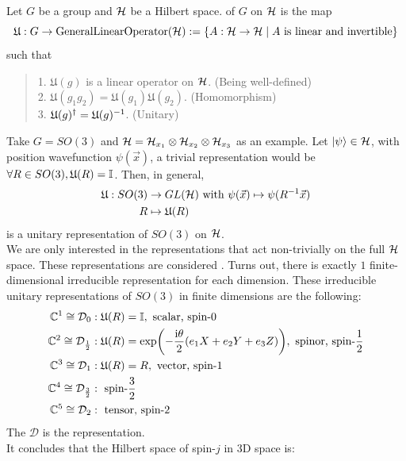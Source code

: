 \begin{definition}
    Let $G$ be a group and $\mathcal{H}$ be a Hilbert space.  of $G$ on $\mathcal{H}$ is the map
    $$\mathfrak{U}: G \to \text{GeneralLinearOperator}(\mathcal{H}) := \{A:\mathcal{H} \to \mathcal{H} \mid A \text{ is linear and invertible}\}$$
    such that
    \begin{quote}
        1. $\mathfrak{U}(g)$ is a linear operator on $\mathcal{H}$. (Being well-defined) \\
        2. $\mathfrak{U}(g_1g_2) = \mathfrak{U}(g_1)\mathfrak{U}(g_2)$. (Homomorphism) \\
        3. $\mathfrak{U}(g)^{\dagger} = \mathfrak{U}(g)^{-1}$. (Unitary)
    \end{quote}
\end{definition}
Take $G = SO(3)$ and $\mathcal{H} = \mathcal{H}_{x_1} \otimes \mathcal{H}_{x_2} \otimes \mathcal{H}_{x_3}$ as an example. Let $\ket{\psi} \in \mathcal{H}$, with position wavefunction $\psi(\vec{x})$, a trivial representation would be $\forall R \in SO(3), \mathfrak{U}(R) = \mathbb{I}$. Then, in general,
\begin{align*}
    \mathfrak{U}: SO(3) &\to GL(\mathcal{H}) \text{ with } \psi(\vec{x}) \mapsto \psi(R^{-1}\vec{x}) \\
    R &\mapsto \mathfrak{U}(R)
\end{align*}
is a unitary representation of $SO(3)$ on $\mathcal{H}$. \\
We are only interested in the representations that act non-trivially on the full $\mathcal{H}$ space. These representations are considered . Turns out, there is exactly $1$ finite-dimensional irreducible representation for each dimension. These irreducible unitary representations of $SO(3)$ in finite dimensions are the following:
\begin{align*}
    \mathbb{C}^1 \cong \mathcal{D}_0 &: \mathfrak{U}(R) = \mathbb{I}, \text{ scalar, spin-}0 \\
    \mathbb{C}^2 \cong \mathcal{D}_\frac{1}{2} &: \mathfrak{U}(R) = \exp(-\frac{\mathrm{i} \theta}{2}(e_1X + e_2Y + e_3Z)), \text{ spinor, spin-}\frac{1}{2} \\
    \mathbb{C}^3 \cong \mathcal{D}_1 &: \mathfrak{U}(R) = R, \text{ vector, spin-}1 \\
    \mathbb{C}^4 \cong \mathcal{D}_\frac{3}{2} &: \text{ spin-}\frac{3}{2} \\
    \mathbb{C}^5 \cong \mathcal{D}_2 &: \text{ tensor, spin-}2
\end{align*}
The $\mathcal{D}$ is the representation. \\
It concludes that the Hilbert space of spin-$j$ in 3D space is:
